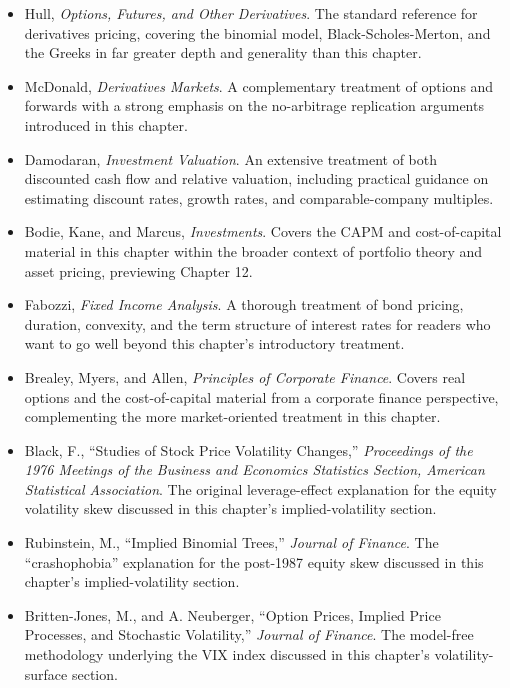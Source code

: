 \documentclass[../ai_in_finance]{subfiles}
\begin{document}
\begin{itemize}
    \item Hull, \emph{Options, Futures, and Other Derivatives}. The standard reference for derivatives pricing, covering the binomial model, Black-Scholes-Merton, and the Greeks in far greater depth and generality than this chapter.
    \item McDonald, \emph{Derivatives Markets}. A complementary treatment of options and forwards with a strong emphasis on the no-arbitrage replication arguments introduced in this chapter.
    \item Damodaran, \emph{Investment Valuation}. An extensive treatment of both discounted cash flow and relative valuation, including practical guidance on estimating discount rates, growth rates, and comparable-company multiples.
    \item Bodie, Kane, and Marcus, \emph{Investments}. Covers the CAPM and cost-of-capital material in this chapter within the broader context of portfolio theory and asset pricing, previewing Chapter 12.
    \item Fabozzi, \emph{Fixed Income Analysis}. A thorough treatment of bond pricing, duration, convexity, and the term structure of interest rates for readers who want to go well beyond this chapter's introductory treatment.
    \item Brealey, Myers, and Allen, \emph{Principles of Corporate Finance}. Covers real options and the cost-of-capital material from a corporate finance perspective, complementing the more market-oriented treatment in this chapter.
    \item Black, F., ``Studies of Stock Price Volatility Changes,'' \emph{Proceedings of the 1976 Meetings of the Business and Economics Statistics Section, American Statistical Association}. The original leverage-effect explanation for the equity volatility skew discussed in this chapter's implied-volatility section.
    \item Rubinstein, M., ``Implied Binomial Trees,'' \emph{Journal of Finance}. The ``crashophobia'' explanation for the post-1987 equity skew discussed in this chapter's implied-volatility section.
    \item Britten-Jones, M., and A. Neuberger, ``Option Prices, Implied Price Processes, and Stochastic Volatility,'' \emph{Journal of Finance}. The model-free methodology underlying the VIX index discussed in this chapter's volatility-surface section.
\end{itemize}
\end{document}
